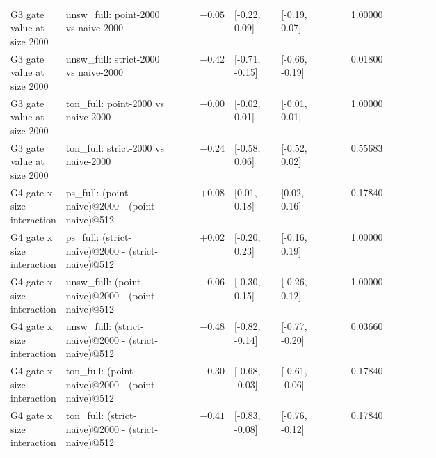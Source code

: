 {\begin{longtable}{p{0.12\linewidth} p{0.27\linewidth} r p{0.11\linewidth} p{0.11\linewidth} r p{0.10\linewidth}}
G3 gate value at size 2000 & unsw\_full: point-2000 vs naive-2000 & $-0.05$ & [-0.22, 0.09] & [-0.19, 0.07] & 1.00000 &  \\
G3 gate value at size 2000 & unsw\_full: strict-2000 vs naive-2000 & $-0.42$ & [-0.71, -0.15] & [-0.66, -0.19] & 0.01800 &  \\
G3 gate value at size 2000 & ton\_full: point-2000 vs naive-2000 & $-0.00$ & [-0.02, 0.01] & [-0.01, 0.01] & 1.00000 &  \\
G3 gate value at size 2000 & ton\_full: strict-2000 vs naive-2000 & $-0.24$ & [-0.58, 0.06] & [-0.52, 0.02] & 0.55683 &  \\
G4 gate x size interaction & ps\_full: (point-naive)@2000 - (point-naive)@512 & $+0.08$ & [0.01, 0.18] & [0.02, 0.16] & 0.17840 &  \\
G4 gate x size interaction & ps\_full: (strict-naive)@2000 - (strict-naive)@512 & $+0.02$ & [-0.20, 0.23] & [-0.16, 0.19] & 1.00000 &  \\
G4 gate x size interaction & unsw\_full: (point-naive)@2000 - (point-naive)@512 & $-0.06$ & [-0.30, 0.15] & [-0.26, 0.12] & 1.00000 &  \\
G4 gate x size interaction & unsw\_full: (strict-naive)@2000 - (strict-naive)@512 & $-0.48$ & [-0.82, -0.14] & [-0.77, -0.20] & 0.03660 &  \\
G4 gate x size interaction & ton\_full: (point-naive)@2000 - (point-naive)@512 & $-0.30$ & [-0.68, -0.03] & [-0.61, -0.06] & 0.17840 &  \\
G4 gate x size interaction & ton\_full: (strict-naive)@2000 - (strict-naive)@512 & $-0.41$ & [-0.83, -0.08] & [-0.76, -0.12] & 0.17840 &  \\
\bottomrule
\end{longtable}
}
